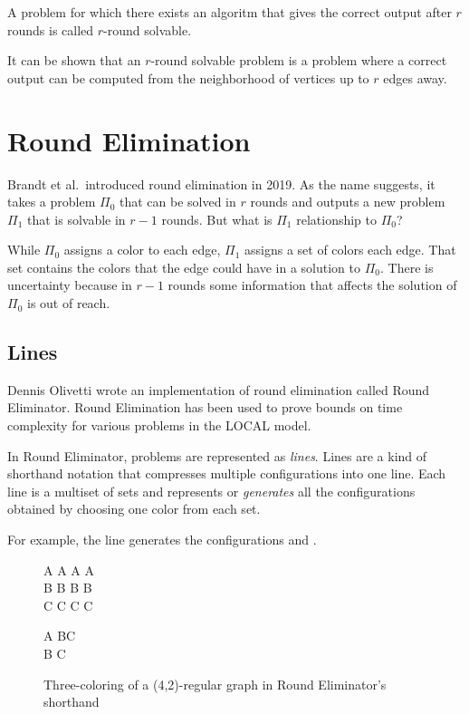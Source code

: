 \documentclass[english, 12pt, a4paper, sci, a-1b, online]{aaltothesis}
\begin{document}
A problem for which there exists an algoritm that gives the correct output after $r$ rounds is called $r$-round solvable.

It can be shown that an $r$-round solvable problem is a problem where a correct output can be computed from the neighborhood of vertices up to $r$ edges away.


\section{Round Elimination}

Brandt et al.\ introduced round elimination in 2019\cite{speedup}. As the name suggests, it takes a problem $\Pi_0$ that can be solved in $r$ rounds and outputs a new problem $\Pi_1$ that is solvable in $r-1$ rounds. But what is $\Pi_1$ relationship to $\Pi_0$?

While $\Pi_0$ assigns a color to each edge, $\Pi_1$ assigns a set of colors each edge. That set contains the colors that the edge could have in a solution to $\Pi_0$. There is uncertainty because in $r-1$ rounds some information that affects the solution of $\Pi_0$ is out of reach.

\subsection{Lines}

Dennis Olivetti wrote an implementation of round elimination called Round Eliminator\cite{RE}. Round Elimination has been used to prove bounds on time complexity for various problems in the LOCAL model\cite{tc1, tc2, tc3}.

In Round Eliminator, problems are represented as \emph{lines}. Lines are a kind of shorthand notation that compresses multiple configurations into one line. Each line is a multiset of sets and represents or \emph{generates} all the configurations obtained by choosing one color from each set.\cite{RE}

For example, the line  generates the configurations  and .

\begin{figure}[h]
  \centering
  \begin{tcolorbox}[width=.2\textwidth, nobeforeafter, title=active side]
  A A A A \\
  B B B B \\
  C C C C
  \end{tcolorbox}
  \begin{tcolorbox}[width=.2\textwidth, nobeforeafter, title=passive side]
  A BC \\
  B C
  \end{tcolorbox}
  \caption{Three-coloring of a (4,2)-regular graph in Round Eliminator's shorthand}
\end{figure}
\end{document}

